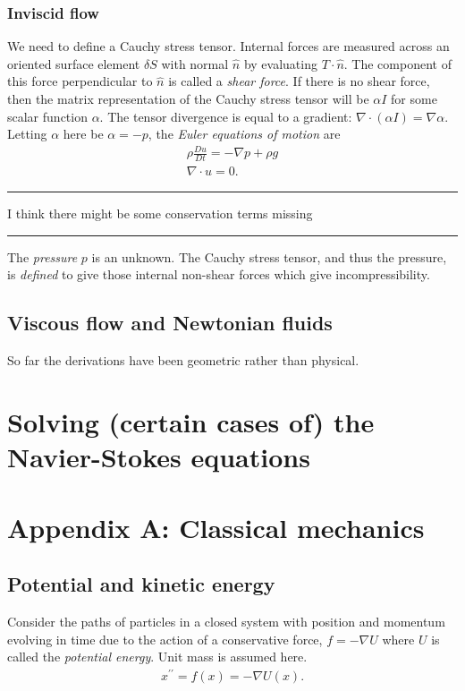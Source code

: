 \documentclass[11pt,a4paper]{memoir}
\newcommand{\ppr}{{\prime\prime}}
\newcommand{\todo}[1]{\vskip 0.1in \hrule \vskip 0.03in {#1} \vskip 0.03in \hrule \vskip 0.1in}
\begin{document}
\subsubsection{Inviscid flow}
We need to define a Cauchy stress tensor. Internal forces are measured across an oriented surface element $\delta S$ with normal $\hat{n}$ by evaluating
$T\cdot \hat{n}$. The component of this force perpendicular to $\hat{n}$ is called a \textit{shear force}.
If there is no shear force, then the matrix representation of the Cauchy stress tensor will be $\alpha I$ for some scalar function $\alpha$.
The tensor divergence is equal to a gradient: $\nabla \cdot \left(\alpha I\right) = \nabla \alpha$. Letting $\alpha$ here be $\alpha = -p$,
the \textit{Euler equations of motion} are
\begin{equation}\label{Euler}
\begin{split}
    \rho \frac{Du}{Dt} = -\nabla p + \rho g \\
    \nabla \cdot u = 0.
\end{split}
\end{equation}
\todo{I think there might be some conservation terms missing}
The \textit{pressure} $p$ is an unknown. The Cauchy stress tensor, and thus the pressure, is \textit{defined} to give those internal non-shear forces
which give incompressibility.
\subsection{Viscous flow and Newtonian fluids} %
So far the derivations have been geometric rather than physical.


\section{Solving (certain cases of) the Navier-Stokes equations}


\section{Appendix A: Classical mechanics}
\subsection{Potential and kinetic energy} %
Consider the paths of particles in a closed system with position and momentum evolving in time
due to the action of a conservative force, $f = -\nabla U$ where $U$ is called the \textit{potential energy}.
Unit mass is assumed here.
\begin{equation}
\begin{split}
    x^\ppr = f(x) = -\nabla U(x).
\end{split}
\end{equation}
\end{document}
